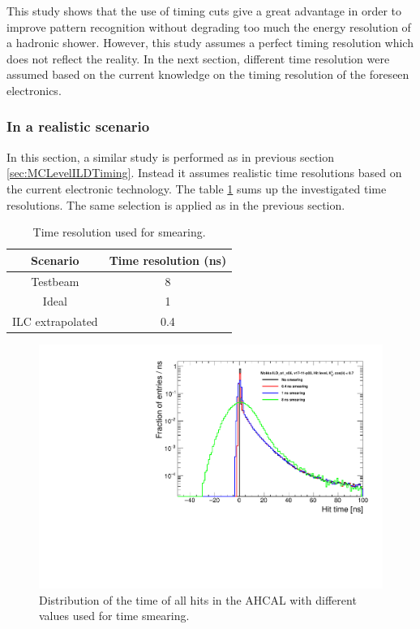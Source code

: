 This study shows that the use of timing cuts give a great advantage in order to improve pattern recognition without degrading too much the energy resolution of a hadronic shower. However, this study assumes a perfect timing resolution which does not reflect the reality. In the next section, different time resolution were assumed based on the current knowledge on the timing resolution of the foreseen electronics.

\subsubsection{In a realistic scenario}

In this section, a similar study is performed as in previous section \ref{sec:MCLevelILDTiming}. Instead it assumes realistic time resolutions based on the current electronic technology. The table \ref{table:TimeReso} sums up the investigated time resolutions. The same selection is applied as in the previous section.

\begin{table}[htb!]
  \centering
  \caption{Time resolution used for smearing.} \label{table:TimeReso}
  \begin{tabular}{|c|c|}
    \hline
    Scenario & Time resolution (ns) \\
    \hline
    Testbeam & 8 \\
    Ideal & 1 \\
    ILC extrapolated & 0.4 \\
    \hline
  \end{tabular}
\end{table}

\begin{figure}[htbp!]
  \centering
  \includegraphics[width=0.7\linewidth]{../Thesis_Plots/ILD/TimeDistribution/Plots/ComparisonSmearingTimingAHCAL}
  \caption{Distribution of the time of all hits in the AHCAL with different values used for time smearing.} \label{fig:SmearingAHCAL}
\end{figure}

